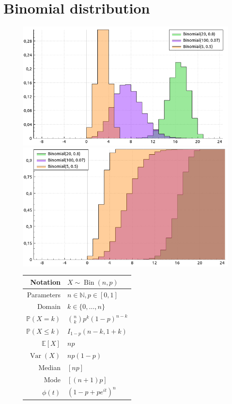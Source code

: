 \documentclass[a4paper,11pt]{article}
\theoremstyle{plain}
\theoremstyle{definition}
\newcommand{\ME}{\mathbb{E}}
\newcommand{\MP}{\mathbb{P}}
\newcommand{\MN}{\mathbb{N}}
\newcommand{\Var}{\operatorname{Var}}
\begin{document}
	\section{Binomial distribution}
	\begin{figure}[!htb]\centering
		\begin{minipage}{0.55\textwidth}
			\includegraphics[width=\linewidth, right]{binomial_pmf}
			\captionsetup{labelformat=empty}
			\includegraphics[width=\linewidth, right]{binomial_cdf}
			\captionsetup{labelformat=empty}
		\end{minipage}
		\begin{minipage}{0.4\textwidth}
			\begin{tabular}{| r | l |}
			\hline
			Notation & $ X \sim \operatorname{Bin}(n, p) $ \\
			\hline
			Parameters & $ n \in \MN, p \in [0, 1]  $ \\
			\hline
			Domain & $ k \in \{0, \dots, n  \} $  \\
			\hline
			$\MP(X = k)$ & $\binom{n}{k} p^k (1-p)^{n-k}$ \\
			\hline
			$\MP(X \leq k)$ & $I_{1-p}(n-k, 1+k) $ \\
			\hline
			$\ME[X]$ & $ np$ \\
			\hline
			$\Var(X)$ & $np(1-p)$ \\
			\hline
			Median & $[np]$ \\
			\hline
			Mode & $[(n+1)p]$ \\
			\hline
			$\phi(t)$ & $ (1-p+pe^{it})^n  $ \\
			\hline
		\end{tabular}
		\end{minipage}
	\end{figure}
	
\end{document}
